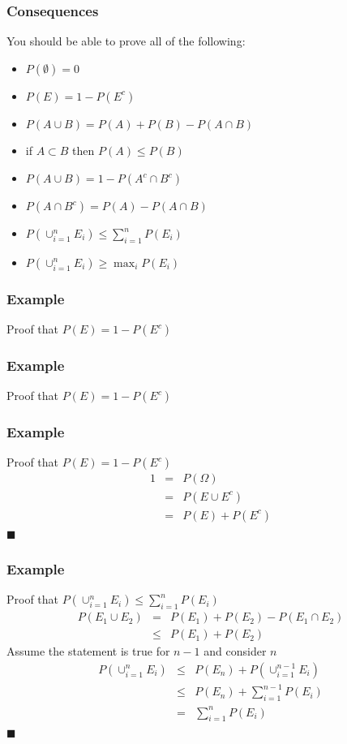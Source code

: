 \documentclass[aspectratio=169]{beamer}
\begin{document}
\begin{frame}
\frametitle{Consequences} 
You should be able to prove all of the following:
\begin{itemize}
\item $P(\emptyset) = 0$
\item $P(E) = 1 - P(E^c)$
\item $P(A \cup B) = P(A) + P(B) - P(A \cap B)$
\item if $A \subset B$ then $P(A) \leq P(B)$
\item $P\left(A \cup B\right) = 1 - P(A^c \cap B^c)$
\item $P(A \cap B^c) = P(A) - P(A \cap B)$
\item $P(\cup_{i=1}^n E_i) \leq \sum_{i=1}^n P(E_i)$
\item $P(\cup_{i=1}^n E_i) \geq \max_i P(E_i)$
\end{itemize}
\end{frame}

\begin{frame}
\frametitle{Example} 
Proof that $P(E) = 1 - P(E^c)$
\end{frame}

\begin{frame}
\frametitle{Example} 
Proof that $P(E) = 1 - P(E^c)$
\end{frame}

\begin{frame}
\frametitle{Example} 
Proof that $P(E) = 1 - P(E^c)$
\begin{eqnarray*}
1 & = & P(\Omega) \\
  & = & P(E \cup E^c)\\
  & = & P(E) + P(E^c)
\end{eqnarray*}
$\blacksquare$
\end{frame}

\begin{frame}
\frametitle{Example}
Proof that $P(\cup_{i=1}^n E_i) \leq \sum_{i=1}^n P(E_i)$\\
\begin{eqnarray*}
  P(E_1 \cup E_2) & =   & P(E_1) + P(E_2) - P(E_1 \cap E_2) \\
                  &\leq & P(E_1) + P(E_2)
\end{eqnarray*}
Assume the statement is true for $n-1$ and consider $n$
\begin{eqnarray*}
  P(\cup_{i=1}^n E_i) & \leq & P(E_n) + P(\cup_{i=1}^{n-1} E_i) \\
                      & \leq & P(E_n) + \sum_{i=1}^{n-1} P(E_i) \\
                      & =    & \sum_{i=1}^n P(E_i)
\end{eqnarray*}
$\blacksquare$
\end{frame}
\end{document}
